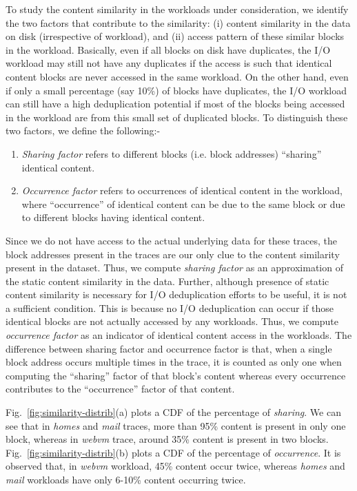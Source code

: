 To study the content similarity in the workloads under consideration,
we identify the two factors that contribute to the similarity: 
(i) content similarity in the data on disk (irrespective of workload), 
and (ii) access pattern of these similar blocks in the workload.
Basically, even if all blocks on disk have duplicates, the I/O workload
may still not have any duplicates if the access is such that identical
content blocks are never accessed in the same workload. On the other
hand, even if only a small percentage (say 10\%) of blocks have duplicates, 
the I/O workload can still have a high deduplication potential if
most of the blocks being accessed in the workload are from this
small set of duplicated blocks. To distinguish these two factors,
we define the following:-

\begin{enumerate}
\item \textit{Sharing factor} refers to different
blocks (i.e. block addresses) ``sharing'' identical content.
\item \textit{Occurrence factor} refers to occurrences of identical content
in the workload, %
where ``occurrence'' of identical content can be due to the
same block or due to different blocks having identical content. 
\end{enumerate}

Since we do not have access to the actual underlying data for these traces, 
the block addresses present in the traces are our only clue to the content similarity 
present in the dataset. Thus, we compute \textit{sharing factor} as an approximation 
of the static content similarity in the data. 
Further, although presence of static content similarity is necessary for I/O 
deduplication efforts to be useful, it is not a sufficient condition. This is 
because no I/O deduplication can occur if those identical blocks are not actually 
accessed by any workloads. Thus, we compute \textit{occurrence factor} as an indicator 
of identical content access in the workloads.
The difference between sharing factor and occurrence factor is that, 
when a single block address occurs multiple times in the trace, it is counted as 
only one when computing the ``sharing'' factor of that block’s content whereas 
every occurrence contributes to the ``occurrence'' factor of that content. 


Fig.~\ref{fig:similarity-distrib}(a) plots a CDF of the percentage of \textit{sharing}.
We can see that in \textit{homes} and
\textit{mail} traces, more than 95\% content is present in only one block, whereas
in \textit{webvm} trace, around 35\% content is present in two blocks.
Fig.~\ref{fig:similarity-distrib}(b) plots a CDF of the percentage of \textit{occurrence}.
It is observed that,
in \textit{webvm} workload, 45\% content occur twice,
whereas \textit{homes} and \textit{mail} workloads have only 6-10\% content
occurring twice.


